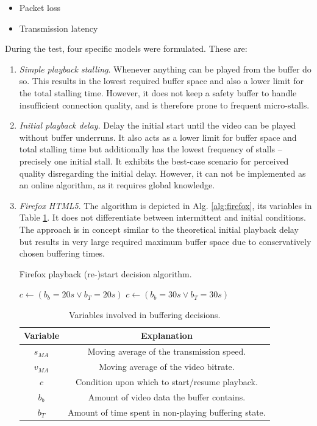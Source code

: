 \begin{itemize}
\item Packet loss
\item Transmission latency
\end{itemize}

During the test, four specific models were formulated. These are:

\begin{enumerate}
\item \textit{Simple playback stalling}. Whenever anything can be played from the buffer do so. This results in the lowest required buffer space and also a lower limit for the total stalling time. However, it does not keep a safety buffer to handle insufficient connection quality, and is therefore prone to frequent micro-stalls.


\item \textit{Initial playback delay}. Delay the initial start until the video can be played without buffer underruns. It also acts as a lower limit for buffer space and total stalling time but additionally has the lowest frequency of stalls -- precisely one initial stall. It exhibits the best-case scenario for perceived quality disregarding the initial delay. However, it can not be implemented as an online algorithm, as it requires global knowledge.


\item \textit{Firefox HTML5}. The algorithm is depicted in Alg. \ref{alg:firefox}, its variables in Table \ref{tab:buffvars}. It does not differentiate between intermittent and initial conditions. The approach is in concept similar to the theoretical initial playback delay but results in very large required maximum buffer space due to conservatively chosen buffering times.

\begin{algorithm}
\centering
\caption{Firefox playback (re-)start decision algorithm.}
\label{alg:firefox}
\begin{algorithmic}
  \STATE $c \gets ( b_b=20s \lor b_T=20s )$
\ELSE
  \STATE $c \gets ( b_b=30s \lor b_T=30s )$
\ENDIF 
\end{algorithmic}
\end{algorithm}

\begin{table}
\centering
\begin{tabular}{|c|c|} \hline
Variable & Explanation \\ \hline\hline
$s_{MA}$ & Moving average of the transmission speed. \\ \hline
$v_{MA}$ & Moving average of the video bitrate. \\ \hline
$c$   & Condition upon which to start/resume playback. \\ \hline
$b_b$    & Amount of video data the buffer contains. \\ \hline
$b_T$    & Amount of time spent in non-playing buffering state. \\ \hline
\end{tabular}
\caption{Variables involved in buffering decisions.}
\label{tab:buffvars}
\end{table}


\end{enumerate}
